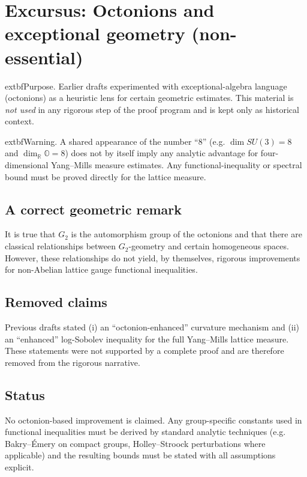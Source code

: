 \section{Excursus: Octonions and exceptional geometry (non-essential)}
\label{sec:octonion}

	extbf{Purpose.} Earlier drafts experimented with exceptional-algebra language
(octonions) as a heuristic lens for certain geometric estimates.
This material is \emph{not used} in any rigorous step of the proof program and is
kept only as historical context.

	extbf{Warning.} A shared appearance of the number ``8'' (e.g. $\dim SU(3)=8$ and
$\dim_{\mathbb{R}}\mathbb{O}=8$) does not by itself imply any analytic advantage for
four-dimensional Yang--Mills measure estimates. Any functional-inequality or
spectral bound must be proved directly for the lattice measure.

\subsection{A correct geometric remark}

It is true that $G_2$ is the automorphism group of the octonions and that there
are classical relationships between $G_2$-geometry and certain homogeneous spaces.
However, these relationships do not yield, by themselves, rigorous improvements
for non-Abelian lattice gauge functional inequalities.

\subsection{Removed claims}

Previous drafts stated (i) an ``octonion-enhanced'' curvature mechanism and
(ii) an ``enhanced'' log-Sobolev inequality for the full Yang--Mills lattice
measure. These statements were not supported by a complete proof and are
therefore removed from the rigorous narrative.

\subsection{Status}

No octonion-based improvement is claimed.
Any group-specific constants used in functional inequalities must be derived by
standard analytic techniques (e.g. Bakry--\'Emery on compact groups, Holley--Stroock
perturbations where applicable) and the resulting bounds must be stated with all
assumptions explicit.







